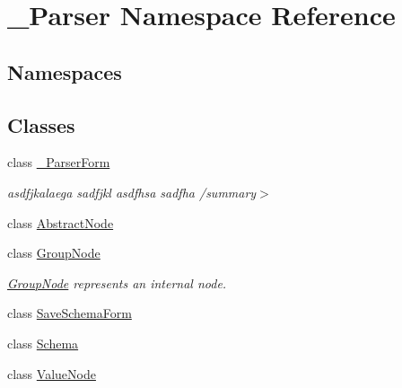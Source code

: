 \hypertarget{namespace__1920_parser}{}\section{\+\_\+Parser Namespace Reference}
\label{namespace__1920_parser}
\subsection*{Namespaces}
\begin{DoxyCompactItemize}
\end{DoxyCompactItemize}
\subsection*{Classes}
\begin{DoxyCompactItemize}
\item 
class \hyperlink{class__1920_parser_1_1__1920_parser_form}{\+\_\+Parser\+Form}
\begin{DoxyCompactList}\small\item\em asdfjkalaega sadfjkl asdfhsa sadfha /summary$>$ \end{DoxyCompactList}\item 
class \hyperlink{class__1920_parser_1_1_abstract_node}{Abstract\+Node}
\item 
class \hyperlink{class__1920_parser_1_1_group_node}{Group\+Node}
\begin{DoxyCompactList}\small\item\em \hyperlink{class__1920_parser_1_1_group_node}{Group\+Node} represents an internal node. \end{DoxyCompactList}\item 
class \hyperlink{class__1920_parser_1_1_save_schema_form}{Save\+Schema\+Form}
\item 
class \hyperlink{class__1920_parser_1_1_schema}{Schema}
\item 
class \hyperlink{class__1920_parser_1_1_value_node}{Value\+Node}
\end{DoxyCompactItemize}
